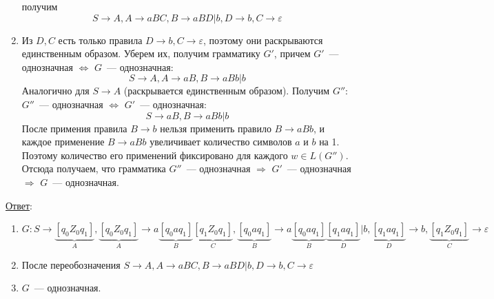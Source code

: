 \documentclass[a4paper]{article}
\begin{document}
\begin{enumerate}
получим $$S\to A, A\to aBC, B\to aBD|b, D\to b, C\to \varepsilon$$
\item Из $D,C$ есть только правила $D\to b,C\to\varepsilon$, поэтому они раскрываются единственным образом. Уберем их, получим грамматику $G'$, причем $G'$~--- однозначная $\Leftrightarrow$ $G$~--- однозначная:
$$S\to A, A\to aB, B\to aBb|b$$
Аналогично для $S\to A$ (раскрывается единственным образом). Получим $G''\colon$ $G''$~--- однозначная $\Leftrightarrow$ $G'$~--- однозначная:
$$S\to aB, B\to aBb|b$$
После примения правила $B\to b$ нельзя применить правило $B\to aBb$, и каждое применение $B\to aBb$ увеличивает количество символов $a$ и $b$ на 1. Поэтому количество его применений фиксировано для каждого $w\in L(G'')$. Отсюда получаем, что грамматика $G''$~--- однозначная $\Rightarrow$ $G'$~--- однозначная $\Rightarrow$ $G$~--- однозначная.
\\[5pt]
\end{enumerate}
\underline{Ответ}:\begin{enumerate}
\item $G\colon S\to \underbrace{[q_0Z_0q_1]}_A, \underbrace{[q_0Z_0q_1]}_A\to a\underbrace{[q_0aq_1]}_B\underbrace{[q_1Z_0q_1]}_C, \underbrace{[q_0aq_1]}_B\to a\underbrace{[q_0aq_1]}_B\underbrace{[q_1aq_1]}_D\big|b, \underbrace{[q_1aq_1]}_D\to b, \underbrace{[q_1Z_0q_1]}_C\to \varepsilon$
\item После переобозначения $S\to A, A\to aBC, B\to aBD|b, D\to b, C\to \varepsilon$
\item $G$~--- однозначная.
\end{enumerate}
\end{document}
